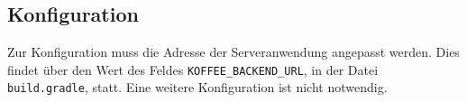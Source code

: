 \subsection{Konfiguration}
\label{subsec:app:configuration}
Zur Konfiguration muss die Adresse der Serveranwendung angepasst werden.
Dies findet über den Wert des Feldes \verb|KOFFEE_BACKEND_URL|, in der Datei \verb|build.gradle|, statt.
Eine weitere Konfiguration ist nicht notwendig.
